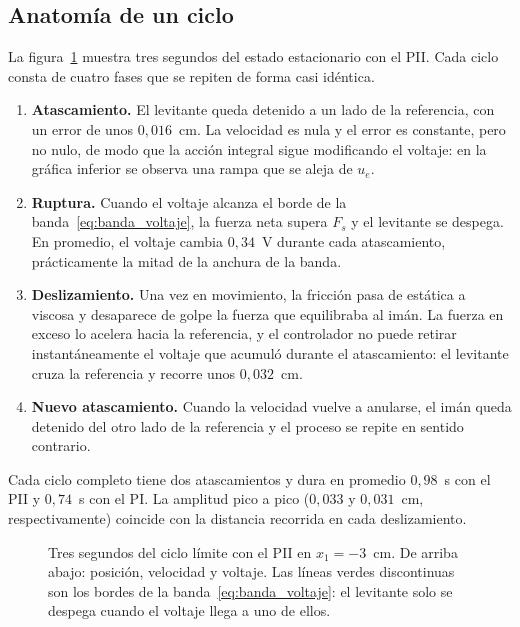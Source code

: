 \subsection{Anatomía de un ciclo}

La figura~\ref{fig:anatomia} muestra tres segundos del estado estacionario con el PII. Cada ciclo consta de cuatro fases que se repiten de forma casi idéntica.

\begin{enumerate}
  \item \textbf{Atascamiento.} El levitante queda detenido a un lado de la referencia, con un error de unos $0{,}016$~cm. La velocidad es nula y el error es constante, pero no nulo, de modo que la acción integral sigue modificando el voltaje: en la gráfica inferior se observa una rampa que se aleja de $u_e$.
  \item \textbf{Ruptura.} Cuando el voltaje alcanza el borde de la banda~\eqref{eq:banda_voltaje}, la fuerza neta supera $F_s$ y el levitante se despega. En promedio, el voltaje cambia $0{,}34$~V durante cada atascamiento, prácticamente la mitad de la anchura de la banda.
  \item \textbf{Deslizamiento.} Una vez en movimiento, la fricción pasa de estática a viscosa y desaparece de golpe la fuerza que equilibraba al imán. La fuerza en exceso lo acelera hacia la referencia, y el controlador no puede retirar instantáneamente el voltaje que acumuló durante el atascamiento: el levitante cruza la referencia y recorre unos $0{,}032$~cm.
  \item \textbf{Nuevo atascamiento.} Cuando la velocidad vuelve a anularse, el imán queda detenido del otro lado de la referencia y el proceso se repite en sentido contrario.
\end{enumerate}

Cada ciclo completo tiene dos atascamientos y dura en promedio $0{,}98$~s con el PII y $0{,}74$~s con el PI. La amplitud pico a pico ($0{,}033$ y $0{,}031$~cm, respectivamente) coincide con la distancia recorrida en cada deslizamiento.

\begin{figure}[ht]
    \centering
    
    \caption[Anatomía del ciclo límite]{Tres segundos del ciclo límite con el PII en $x_1=-3$~cm. De arriba abajo: posición, velocidad y voltaje. Las líneas verdes discontinuas son los bordes de la banda~\eqref{eq:banda_voltaje}: el levitante solo se despega cuando el voltaje llega a uno de ellos.}
    \label{fig:anatomia}
\end{figure}

